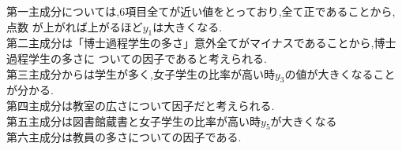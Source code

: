 \documentclass[dvipdfmx,autodetect-engine,titlepage]{jsarticle}
\begin{document}
第一主成分については,6項目全てが近い値をとっており,全て正であることから,点数
が上がれば上がるほど\begin{math}y_1\end{math}は大きくなる.\\
第二主成分は「博士過程学生の多さ」意外全てがマイナスであることから,博士過程学生の多さに
ついての因子であると考えられる.\\
第三主成分からは学生が多く,女子学生の比率が高い時\begin{math}y_3\end{math}の値が大きくなることが分かる.\\
第四主成分は教室の広さについて因子だと考えられる.\\
第五主成分は図書館蔵書と女子学生の比率が高い時\begin{math}y_5\end{math}が大きくなる\\
第六主成分は教員の多さについての因子である.
\end{document}
